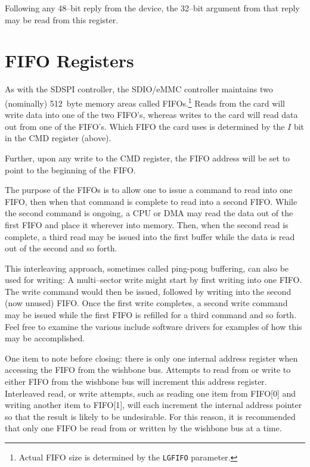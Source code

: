 \documentclass{gqtekspec}
\begin{document}
Following any 48--bit reply from the device, the 32--bit argument from that
reply may be read from this register.

\section{FIFO Registers}	%
As with the SDSPI controller, the SDIO/eMMC controller maintains two (nominally)
512~byte memory areas called FIFOs.\footnote{Actual FIFO size is determined
by the {\tt LGFIFO} parameter.}  Reads from the card will write data into one
of the two FIFO's, whereas writes to the card will read data out from one of
the FIFO's.  Which FIFO the card uses is determined by the $I$ bit in the CMD
register (above).

Further, upon any write to the CMD register, the FIFO address will be set
to point to the beginning of the FIFO.

The purpose of the FIFOs is to allow one to issue a command to read into one
FIFO, then when that command is complete to read into a second FIFO.  While
the second command is ongoing, a CPU or DMA may read the data out of the first
FIFO and place it wherever into memory.  Then, when the second read is complete,
a third read may be issued into the first buffer while the data is read out of
the second and so forth.

This interleaving approach, sometimes called ping-pong buffering, can also be
used for writing: A multi--sector write might start by first writing into one
FIFO.  The write command would then be issued, followed by writing into the
second (now unused) FIFO.  Once the first write completes, a second write
command may be issued while the first FIFO is refilled for a third command
and so forth.  Feel free to examine the various include software drivers for
examples of how this may be accomplished.

One item to note before closing: there is only one internal address register
when accessing the FIFO from the wishbone bus.  Attempts to read from or write
to either FIFO from the wishbone bus will increment this address register. 
Interleaved read, or write attempts, such as reading one item from
FIFO[0] and writing another item to FIFO[1], will each increment the internal
address pointer so that the result is likely to be undesirable.  For this
reason, it is recommended that only one FIFO be read from or written by the
wishbone bus at a time.
\end{document}
